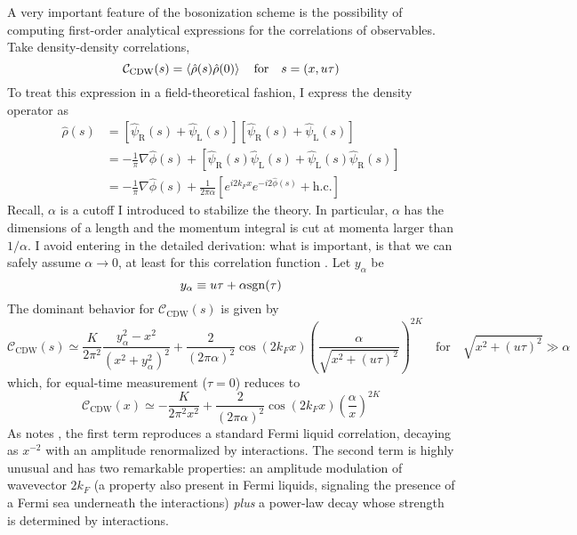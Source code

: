 A very important feature of the bosonization scheme is the possibility of computing first-order analytical expressions for the correlations of observables. Take density-density correlations,
\[
	\mathcal{C}_\mathrm{CDW}(s) = \ev{\hat \rho(s) \hat \rho(0)}
	\quad\text{for}\quad
	s = (x,u\tau)
\]
To treat this expression in a field-theoretical fashion, I express the density operator as
\[
	\begin{aligned}
		\hat \rho(s) &= \left[
			\hat \psi_\mathrm{R}(s) + \hat \psi_\mathrm{L}(s)
		\right] \left[
			\hat \psi_\mathrm{R}(s) + \hat \psi_\mathrm{L}(s)
		\right] \\
		&= - \frac{1}{\pi} \nabla \hat \phi(s) + \left[
			\hat \psi_\mathrm{R}(s) \hat \psi_\mathrm{L}(s) + \hat \psi_\mathrm{L}(s) \hat \psi_\mathrm{R}(s) 
		\right] \\
		&= - \frac{1}{\pi} \nabla \hat \phi(s) + \frac{1}{2\pi\alpha} \left[
			e^{i 2k_F x} e^{-i 2 \hat \phi(s)}
			+ \mathrm{h.c.}
		\right]
	\end{aligned}
\]
Recall, $\alpha$ is a cutoff I introduced to stabilize the theory. In particular, $\alpha$ has the dimensions of a length and the momentum integral is cut at momenta larger than $1/\alpha$. I avoid entering in the detailed derivation: what is important, is that we can safely assume $\alpha \to 0$, at least for this correlation function \cite{haldane1981luttinger}. Let $y_\alpha$ be
\[
	y_\alpha \equiv u\tau + \alpha \mathrm{sgn}(\tau)
\]
The dominant behavior for $\mathcal{C}_\mathrm{CDW}(s)$ is given by
\[
	\mathcal{C}_\mathrm{CDW}(s) \simeq \frac{K}{2\pi^2} \frac{y_\alpha^2 - x^2}{(x^2 + y_\alpha^2)^2} + \frac{2}{(2\pi\alpha)^2} \cos\left(2k_F x\right) \left(
		\frac{\alpha}{\sqrt{x^2 + (u\tau)^2}}
	\right)^{2K}
	\quad\text{for}\quad \sqrt{x^2 + (u\tau)^2} \gg \alpha
\]
which, for equal-time measurement ($\tau=0$) reduces to
\begin{equation}\label{eq:density-density-correlation-power-law}
	\mathcal{C}_\mathrm{CDW}(x) \simeq - \frac{K}{2\pi^2 x^2} +  \frac{2}{(2\pi\alpha)^2} \cos\left(2k_F x\right) \left(
		\frac{\alpha}{x}
	\right)^{2K}
\end{equation}
As \citeauthor{giamarchi2003quantum} notes \cite[Sec.~2.2.2]{giamarchi2003quantum}, the first term reproduces a standard Fermi liquid correlation, decaying as $x^{-2}$ with an amplitude renormalized by interactions. The second term is highly unusual and has two remarkable properties: an amplitude modulation of wavevector $2k_F$ (a property also present in Fermi liquids, signaling the presence of a Fermi sea underneath the interactions) \textit{plus} a power-law decay whose strength is determined by interactions.

